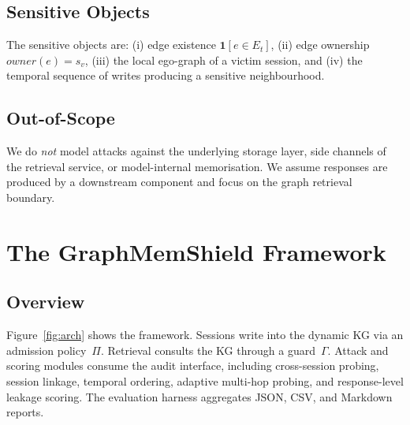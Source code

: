 \documentclass[journal,10pt,twocolumn]{IEEEtran}
\begin{document}
\subsection{Sensitive Objects}
The sensitive objects are: (i) edge existence
$\mathbf{1}[e \in E_t]$, (ii) edge ownership
$\textit{owner}(e) = s_v$, (iii) the local ego-graph of a victim
session, and (iv) the temporal sequence of writes producing a
sensitive neighbourhood.

\subsection{Out-of-Scope}
We do \emph{not} model attacks against the underlying storage layer,
side channels of the retrieval service, or model-internal
memorisation. We assume responses are produced by a downstream
component and focus on the graph retrieval boundary.

\section{The GraphMemShield Framework}
\label{sec:framework}

\subsection{Overview}
Figure~\ref{fig:arch} shows the framework. Sessions write into the
dynamic KG via an admission policy~$\Pi$. Retrieval consults the KG
through a guard~$\Gamma$. Attack and scoring modules consume the
audit interface, including cross-session probing, session linkage,
temporal ordering, adaptive multi-hop probing, and response-level
leakage scoring. The evaluation harness aggregates JSON, CSV, and
Markdown reports.
\end{document}
